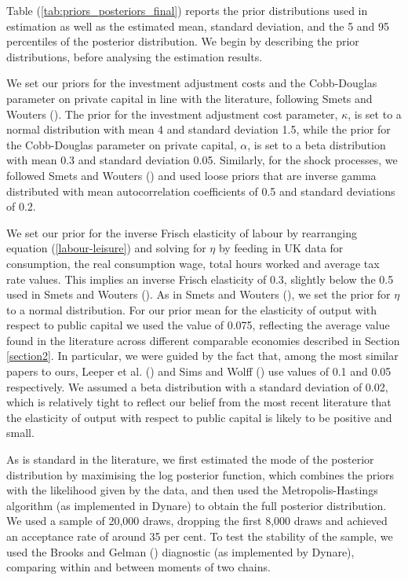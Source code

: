 \documentclass[titlepage, 11pt, a4paper]{article}
\renewcommand{\&}{and}
\begin{document}
Table (\ref{tab:priors_posteriors_final}) reports the prior distributions used in estimation as well as the estimated mean, standard deviation, and the 5 and 95 percentiles of the posterior distribution. 
We begin by describing the prior distributions, before analysing the estimation results.


We set our priors for the investment adjustment costs and the Cobb-Douglas parameter on private capital in line with the literature, following Smets and Wouters (\citeyear{smets2007shocks}). The prior for the investment adjustment cost parameter, $\kappa$, is set to a normal distribution with mean 4 and standard deviation 1.5, while the prior for the Cobb-Douglas parameter on private capital, $\alpha$, is set to a beta distribution with mean 0.3 and standard deviation 0.05.
Similarly, for the shock processes, we followed Smets and Wouters (\citeyear{smets2007shocks}) and used loose priors that are inverse gamma distributed with mean autocorrelation coefficients of 0.5 and standard deviations of 0.2.


We set our prior for the inverse Frisch elasticity of labour by rearranging equation (\ref{labour-leisure}) and solving for $\eta$ by feeding in UK data for consumption, the real consumption wage, total hours worked and average tax rate values. This implies an inverse Frisch elasticity of 0.3, slightly below the 0.5 used in Smets and Wouters (\citeyear{smets2007shocks}).  As in Smets and Wouters (\citeyear{smets2007shocks}), we set the prior for $\eta$ to a normal distribution. 
For our prior mean for the elasticity of output with respect to public capital we used the value of 0.075, reflecting the average value found in the literature across different comparable economies described in Section \ref{section2}. In particular, we were guided by the fact that, among the most similar papers to ours, Leeper et al. (\citeyear{leeper2010government}) and Sims and Wolff (\cite{sims2018output}) use values of 0.1 and 0.05 respectively.
We assumed a beta distribution with a standard deviation of 0.02, which is relatively tight to reflect our belief from the most recent literature that the elasticity of output with respect to public capital is likely to be positive and small.


As is standard in the literature, we first estimated the mode of the posterior distribution by maximising the log posterior function, which combines the priors with the likelihood given by the data, and then used the Metropolis-Hastings algorithm (as implemented in Dynare) to obtain the full posterior distribution. We used a sample of 20,000 draws, dropping the first 8,000 draws and achieved an acceptance rate of around 35 per cent. To test the stability of the sample, we used the Brooks and Gelman (\citeyear{brooks1998general}) diagnostic (as implemented by Dynare), comparing within and between moments of two chains. 
\end{document}
